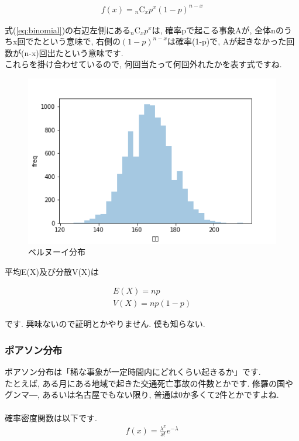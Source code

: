 \documentclass[11pt,a4paper]{jreport}
\begin{document}
\begin{eqnarray}
\label{eq:binomial}
f(x) = {}_n\mathrm{C}_x p^x(1-p)^{n-x}
\end{eqnarray}

式(\ref{eq:binomial})の右辺左側にある${}_n\mathrm{C}_x p^x$は, 確率pで起こる事象Aが, 全体nのうちx回でたという意味で, 右側の$(1-p)^{n-x}$は確率(1-p)で, Aが起きなかった回数が(n-x)回出たという意味です.\\
これらを掛け合わせているので, 何回当たって何回外れたかを表す式ですね.

\begin{figure}[H]
\label{im:bernoulli}
  \centering
  \includegraphics[width=120mm,bb=0 0 432 288]{figures/binomial.png}
  \caption{ベルヌーイ分布}
\end{figure}

平均E(X)及び分散V(X)は

\begin{eqnarray}
E(X) = np\\
V(X) = np(1-p)
\end{eqnarray}

です. 興味ないので証明とかやりません. 僕も知らない.

\subsubsection{ポアソン分布}
ポアソン分布は「稀な事象が一定時間内にどれくらい起きるか」です.\\
たとえば, ある月にある地域で起きた交通死亡事故の件数とかです. 修羅の国やグンマ―, あるいは名古屋でもない限り, 普通は0か多くて2件とかですよね.\\
\\
確率密度関数は以下です.
\begin{eqnarray}
f(x) = \frac{\lambda^x}{x!}e^{-\lambda}
\end{eqnarray}
\end{document}
